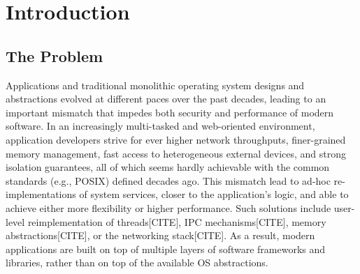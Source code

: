 \section{Introduction}

%	
%	

\subsection{The Problem}

Applications and traditional monolithic operating system designs and abstractions evolved at different paces over the past decades, leading to an important mismatch that impedes both security and performance of modern software.
In an increasingly multi-tasked and web-oriented environment, application developers strive for ever higher network throughputs, finer-grained memory management, fast access to heterogeneous external devices, and strong isolation guarantees, all of which seems hardly achievable with the common standards (e.g., POSIX) defined decades ago.
This mismatch lead to ad-hoc re-implementations of system services, closer to the application's logic, and able to achieve either more flexibility or higher performance.
Such solutions include user-level reimplementation of threads[CITE], IPC mechanisms[CITE], memory abstractions[CITE], or the networking stack[CITE].
As a result, modern applications are built on top of multiple layers of software frameworks and libraries, rather than on top of the available OS abstractions.


